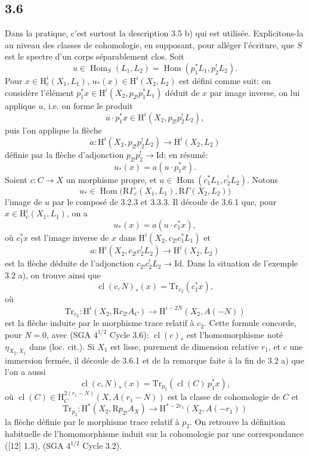 \documentclass[11pt]{article}
\renewcommand{\H}{\mathrm{H}}
\DeclareMathOperator{\Hom}{Hom}
\newcommand{\R}{\mathrm{R}}\newcommand{\RHomCore}{\mathrm{RHom}}
\providecommand{\Id}{\mathrm{Id}}
\providecommand{\Hom}{\operatorname{Hom}}
\providecommand{\R}{\mathrm R}
\providecommand{\Hom}{\operatorname{Hom}}
\begin{document}
\subsection*{3.6}
Dans la pratique, c'est surtout la description 3.5 b) qui est utilisée. Explicitons-la au niveau des classes de cohomologie, en supposant, pour alléger l'écriture, que $S$ est le spectre d'un corps séparablement clos. Soit
\[
u\in\Hom_S(L_1,L_2)=\Hom(p_1^*L_1,p_2^!L_2).
\]
Pour $x\in\H_c^i(X_1,L_1)$, $u_*(x)\in\H^i(X_2,L_2)$ est défini comme suit: on considère l'élément $p_1^*x\in\H^i(X_2,p_{2!}p_1^*L_1)$ déduit de $x$ par image inverse, on lui applique $u$, i.e. on forme le produit
\[
u\cdot p_1^*x\in \H^i(X_2,p_{2!}p_2^!L_2),
\]
puis l'on applique la flèche
\[
a:\H^i(X_2,p_{2!}p_2^!L_2)\longrightarrow \H^i(X_2,L_2)
\]
définie par la flèche d'adjonction $p_{2!}p_2^!\to\Id$; en résumé:
\begin{equation}
u_*(x)=a(u\cdot p_1^*x).
\tag{3.6.1}
\end{equation}
Soient $c:C\to X$ un morphisme propre, et $u\in\Hom(c_1^*L_1,c_2^!L_2)$. Notons
\[
u_*\in\Hom\bigl(\R\Gamma_c(X_1,L_1),\R\Gamma(X_2,L_2)\bigr)
\]
l'image de $u$ par le composé de 3.2.3 et 3.3.3. Il découle de 3.6.1 que, pour $x\in\H_c^i(X_1,L_1)$, on a
\begin{equation}
u_*(x)=a(u\cdot c_1^*x),
\tag{3.6.2}
\end{equation}
où $c_1^*x$ est l'image inverse de $x$ dans $\H^i(X_2,c_{2!}c_1^*L_1)$ et
\[
a:\H^i(X_2,c_{2!}c_2^!L_2)\longrightarrow \H^i(X_2,L_2)
\]
est la flèche déduite de l'adjonction $c_{2!}c_2^!L_2\to\Id$. Dans la situation de l'exemple 3.2 a), on trouve ainsi que
\begin{equation}
\operatorname{cl}(c,N)_*(x)=\mathrm{Tr}_{c_2}(c_1^*x),
\tag{3.6.3}
\end{equation}
où
\[
\mathrm{Tr}_{c_2}:\H^i(X_2,\R c_{2!}A_C)\longrightarrow\H^{i-2N}(X_2,A(-N))
\]
est la flèche induite par le morphisme trace relatif à $c_2$. Cette formule concorde, pour $N=0$, avec (SGA $4^{1/2}$ Cycle 3.6): $\operatorname{cl}(c)_*$ est l'homomorphisme noté $\eta_{X_2,X_1}$ dans (loc. cit.). Si $X_1$ est lisse, purement de dimension relative $r_1$, et $c$ une immersion fermée, il découle de 3.6.1 et de la remarque faite à la fin de 3.2 a) que l'on a aussi
\begin{equation}
\operatorname{cl}(c,N)_*(x)=\mathrm{Tr}_{p_2}(\operatorname{cl}(C)\,p_1^*x),
\tag{3.6.4}
\end{equation}
où $\operatorname{cl}(C)\in \H_C^{2(r_1-N)}(X,A(r_1-N))$ est la classe de cohomologie de $C$ et
\[
\mathrm{Tr}_{p_2}:\H^*(X_2,\R p_{2!}A_X)\longrightarrow \H^{*-2r_1}(X_2,A(-r_1))
\]
la flèche définie par le morphisme trace relatif à $p_2$. On retrouve la définition habituelle de l'homomorphisme induit sur la cohomologie par une correspondance ([12] 1.3), (SGA $4^{1/2}$ Cycle 3.2).
\end{document}
